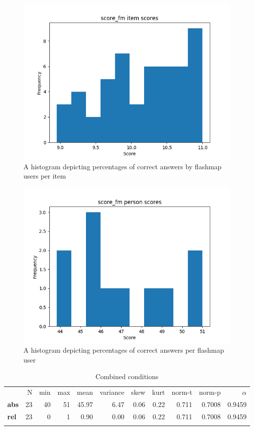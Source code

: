 \begin{figure}
\includegraphics[width=\textwidth]{img/score_fm_diff.png}
    \caption{A histogram depicting percentages of correct answers by flashmap users per item}
    \label{fig:score_fm_diff}
\end{figure}
\begin{figure}
    \includegraphics[width=\textwidth]{img/score_fm_abil.png}
    \caption{A histogram depicting percentages of correct answers per flashmap user}
    \label{fig:score_fm_abil}
\end{figure}

\begin{longtable}[c]{@{}lrrrrrrrrrr@{}}
\caption{Combined conditions}
\endfirsthead
\toprule\addlinespace
& N & min & max & mean & variance & skew & kurt & norm-t &
norm-p & $\alpha$
\\\addlinespace
\midrule
\textbf{abs} & 23 & 40 & 51 & 45.97 & 6.47 & 0.06 & 0.22 & 0.711 &
0.7008 & 0.9459
\\\addlinespace
\textbf{rel} & 23 & 0 & 1 & 0.90 & 0.00 & 0.06 & 0.22 & 0.711 & 0.7008 &
0.9459
\\\addlinespace
\bottomrule
    \label{tab:score_gen}
\end{longtable}


